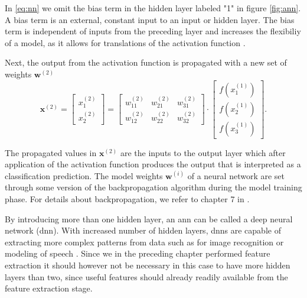 In \eqref{eq:nn} we omit the bias term in the hidden layer labeled "1" in figure \ref{fig:ann}. A bias term is an external, constant input to an input or hidden layer. The bias term is independent of inputs from the preceding layer and increases the flexibiliy of a model, as it allows for translations of the activation function \citep{kohl_2010}.

Next, the output from the activation function is propagated with a new set of weights $\mathbf{w}^{(2)}$
\begin{equation}
	\mathbf{x}^{(2)}=\begin{bmatrix}x_1^{(2)} \\ x_2^{(2)} \end{bmatrix} = 
	\begin{bmatrix} w_{11}^{(2)} & w_{21}^{(2)} & w_{31}^{(2)} \\ w_{12}^{(2)} & w_{22}^{(2)} & w_{32}^{(2)} \end{bmatrix}\cdot \begin{bmatrix}f(x_1^{(1)}) \\ f(x_2^{(1)}) \\ f(x_3^{(1)}) \end{bmatrix}.
\end{equation}

The propagated values in $\mathbf{x}^{(2)}$ are the inputs to the output layer which after application of the activation function produces the output that is interpreted as a classification prediction. The model weights $\mathbf{w}^{(i)}$ of a neural network are set through some version of the backpropagation algorithm during the model training phase. For details about backpropagation, we refer to chapter 7 in \citep{rojas_1996}.

By introducing more than one hidden layer, an \gls{ann} can be called a deep neural network (\gls{dnn}). With increased number of hidden layers, \gls{dnn}s are capable of extracting more complex patterns from data such as for image recognition \citep{szegedy_liu_jia_sermanet_reed_anguelov_erhan_vanhoucke_rabinovich_2018} or modeling of speech \citep{hinton_deng_yu_dahl_mohamed_jaitly_senior_vanhoucke_nguyen_sainath_2012}. Since we in the preceding chapter performed feature extraction it should however not be necessary in this case to have more hidden layers than two, since useful features should already readily available from the feature extraction stage.


